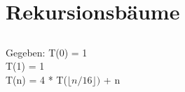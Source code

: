 \section{Rekursionsbäume}
\subsection{}
Gegeben: T(0) = 1 \\
\hspace*{14mm} T(1) = 1 \\
\hspace*{14mm} T(n) = 4 * T($\lfloor{n/16}\rfloor)$ + n 